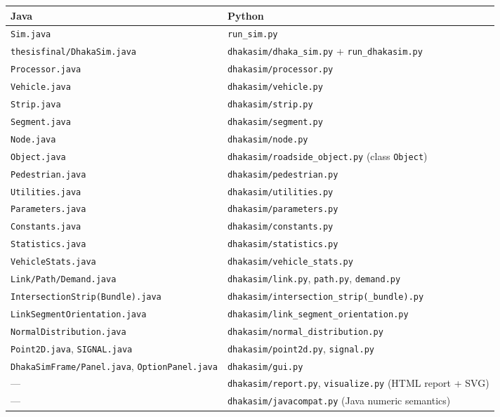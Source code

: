 \documentclass[11pt, a4paper]{article}
\newcommand{\code}[1]{\texttt{#1}}
\begin{document}
\begin{longtable}{l l}
\toprule
\textbf{Java} & \textbf{Python} \\
\midrule
\endhead
\code{Sim.java} & \code{run\_sim.py} \\
\code{thesisfinal/DhakaSim.java} & \code{dhakasim/dhaka\_sim.py} + \code{run\_dhakasim.py} \\
\code{Processor.java} & \code{dhakasim/processor.py} \\
\code{Vehicle.java} & \code{dhakasim/vehicle.py} \\
\code{Strip.java} & \code{dhakasim/strip.py} \\
\code{Segment.java} & \code{dhakasim/segment.py} \\
\code{Node.java} & \code{dhakasim/node.py} \\
\code{Object.java} & \code{dhakasim/roadside\_object.py} (class \code{Object}) \\
\code{Pedestrian.java} & \code{dhakasim/pedestrian.py} \\
\code{Utilities.java} & \code{dhakasim/utilities.py} \\
\code{Parameters.java} & \code{dhakasim/parameters.py} \\
\code{Constants.java} & \code{dhakasim/constants.py} \\
\code{Statistics.java} & \code{dhakasim/statistics.py} \\
\code{VehicleStats.java} & \code{dhakasim/vehicle\_stats.py} \\
\code{Link/Path/Demand.java} & \code{dhakasim/link.py}, \code{path.py}, \code{demand.py} \\
\code{IntersectionStrip(Bundle).java} & \code{dhakasim/intersection\_strip(\_bundle).py} \\
\code{LinkSegmentOrientation.java} & \code{dhakasim/link\_segment\_orientation.py} \\
\code{NormalDistribution.java} & \code{dhakasim/normal\_distribution.py} \\
\code{Point2D.java}, \code{SIGNAL.java} & \code{dhakasim/point2d.py}, \code{signal.py} \\
\code{DhakaSimFrame/Panel.java}, \code{OptionPanel.java} & \code{dhakasim/gui.py} \\
--- & \code{dhakasim/report.py}, \code{visualize.py} (HTML report + SVG) \\
--- & \code{dhakasim/javacompat.py} (Java numeric semantics) \\
\bottomrule
\end{longtable}
\end{document}
